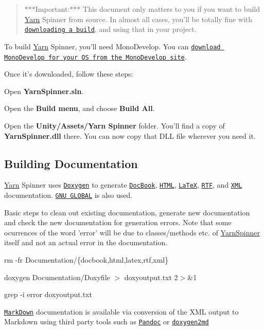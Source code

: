 \begin{quotation}
$\ast$$\ast$$\ast$\-Important\-:$\ast$$\ast$$\ast$ This document only matters to you if you want to build \hyperlink{a00029}{Yarn} Spinner from source. In almost all cases, you'll be totally fine with \href{https://github.com/thesecretlab/YarnSpinner/releases}{\tt downloading a build}, and using that in your project.

\end{quotation}


To build \hyperlink{a00029}{Yarn} Spinner, you'll need Mono\-Develop. You can \href{http://www.monodevelop.com/download/}{\tt download Mono\-Develop for your O\-S from the Mono\-Develop site}.

Once it's downloaded, follow these steps\-:


\begin{DoxyItemize}
\item Open {\bfseries Yarn\-Spinner.\-sln}.
\item Open the {\bfseries Build menu}, and choose {\bfseries Build All}.
\item Open the {\bfseries Unity/\-Assets/\-Yarn Spinner} folder. You'll find a copy of {\bfseries Yarn\-Spinner.\-dll} there. You can now copy that D\-L\-L file wherever you need it.
\end{DoxyItemize}

\subsection*{Building Documentation}

\hyperlink{a00029}{Yarn} Spinner uses \href{https://www.stack.nl/~dimitri/doxygen}{\tt Doxygen} to generate \href{http://docbook.org/}{\tt Doc\-Book}, \href{https://en.wikipedia.org/wiki/HTML}{\tt H\-T\-M\-L}, \href{https://www.latex-project.org/help/documentation/}{\tt La\-Te\-X}, \href{https://en.wikipedia.org/wiki/Rich_Text_Format}{\tt R\-T\-F}, and \href{https://en.wikipedia.org/wiki/XML}{\tt X\-M\-L} documentation. \href{https://www.gnu.org/software/global/}{\tt G\-N\-U G\-L\-O\-B\-A\-L} is also used.

Basic steps to clean out existing documentation, generate new documentation and check the new documentation for generation errors. Note that some ocurrences of the word 'error' will be due to classes/methods etc. of \hyperlink{a00310}{Yarn\-Spinner} itself and not an actual error in the documentation.


\begin{DoxyItemize}
\item rm -\/fr Documentation/\{docbook,html,latex,rtf,xml\}
\item doxygen Documentation/\-Doxyfile $>$ doxyoutput.\-txt 2$>$\&1
\item grep -\/i error doxyoutput.\-txt
\end{DoxyItemize}

\href{https://daringfireball.net/projects/markdown/}{\tt Mark\-Down} documentation is available via conversion of the X\-M\-L output to Markdown using third party tools such as \href{http://pandoc.org}{\tt Pandoc} or \href{https://github.com/pferdinand/doxygen2md}{\tt doxygen2md} 